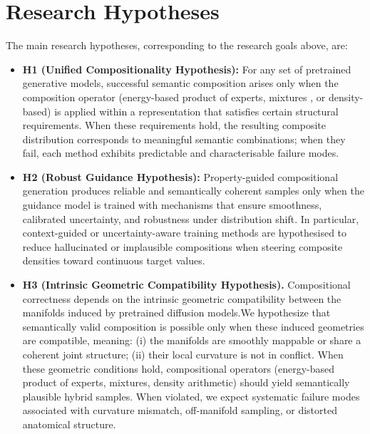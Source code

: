 \section{Research Hypotheses}
\label{sec:research_objectives_research_hypothesis}

The main research hypotheses, corresponding to the research goals above, are:

\begin{itemize}
    \item \textbf{H1 (Unified Compositionality Hypothesis):}
    For any set of pretrained generative models, successful semantic 
    composition arises only when the composition operator 
    (energy-based product of experts, mixtures  , or density-based) is applied within a 
    representation that satisfies certain structural requirements.  
    When these requirements hold, the resulting composite distribution 
    corresponds to meaningful semantic combinations; when they fail, 
    each method exhibits predictable and characterisable failure modes.

    \item \textbf{H2 (Robust Guidance Hypothesis):}
    Property-guided compositional generation produces reliable and 
    semantically coherent samples only when the guidance model is 
    trained with mechanisms that ensure smoothness, calibrated 
    uncertainty, and robustness under distribution shift.  
    In particular, context-guided or uncertainty-aware training methods 
    are hypothesised to reduce hallucinated or implausible compositions 
    when steering composite densities toward continuous target values.

    \item \textbf{H3 (Intrinsic Geometric Compatibility Hypothesis).}
    Compositional correctness depends on the intrinsic geometric compatibility
    between the manifolds induced by pretrained diffusion models.We hypothesize that semantically valid
    composition is possible only when these induced geometries are compatible,
    meaning: (i) the manifolds are smoothly mappable or share a coherent joint
    structure; (ii) their local curvature is not in conflict. When these geometric conditions hold,
    compositional operators (energy-based product of experts, mixtures, density arithmetic) should yield 
    semantically plausible hybrid samples. When violated, we expect systematic failure
    modes associated with curvature mismatch, off-manifold sampling, or distorted
    anatomical structure.
\end{itemize}